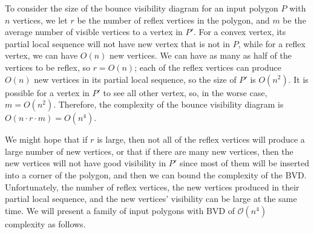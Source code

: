 \documentclass[]{article}  %
\begin{document}
To consider the size of the bounce visibility diagram for an input polygon $P$
with $n$ vertices, we let $r$ be the number of reflex vertices in the polygon,
and $m$ be the average number of visible vertices to a vertex in $P'$. For a
convex vertex, its partial local sequence will not have new vertex that is not
in $P$, while for a reflex vertex, we can have $O(n)$ new vertices. We can have
as many as half of the vertices to be reflex, so $r = O(n)$; each of the reflex
vertices can produce $O(n)$ new vertices in its partial local sequence, so the
size of $P'$ is $O(n^2)$. It is possible for a vertex in $P'$ to see all other
vertex, so, in the worse case, $m = O(n^2)$. Therefore, the complexity of the
bounce visibility diagram is $O(n\cdot r\cdot m) = O(n^4)$.

We might hope that if $r$ is large, then not all of the reflex vertices will
produce a large number of new vertices, or that if there are many new vertices,
then the new vertices will not have good visibility in $P'$ since most of them
will be inserted into a corner of the polygon, and then we can bound the
complexity of the BVD. Unfortunately, the number of reflex vertices, the new
vertices produced in their partial local sequence, and the new vertices'
visibility can be large at the same time. We will present a family of input
polygons with BVD of $\mathcal{O}(n^4)$ complexity as follows.
\end{document}
